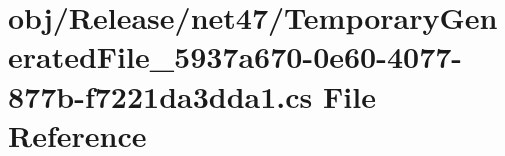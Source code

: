 \hypertarget{_release_2net47_2_temporary_generated_file__5937a670-0e60-4077-877b-f7221da3dda1_8cs}{}\section{obj/\+Release/net47/\+Temporary\+Generated\+File\+\_\+5937a670-\/0e60-\/4077-\/877b-\/f7221da3dda1.cs File Reference}
\label{_release_2net47_2_temporary_generated_file__5937a670-0e60-4077-877b-f7221da3dda1_8cs}
